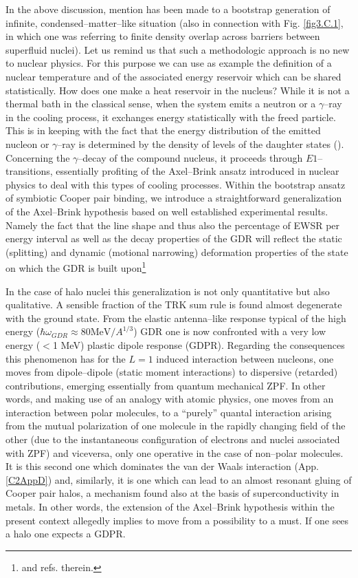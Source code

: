 In the above discussion, mention has been made to a bootstrap generation of infinite, condensed--matter--like situation (also  in connection with Fig. \ref{fig3.C.1}, in which one was referring to finite density overlap across barriers between superfluid nuclei). Let us remind us that such a methodologic approach is no new to nuclear physics. For this purpose we can use as example the definition of a nuclear temperature and of the associated energy reservoir which can be shared statistically. How does one make a heat reservoir in the nucleus? While it is not a thermal bath in the classical sense, when the system emits a neutron or a $\gamma$--ray in the cooling process, it exchanges energy statistically with the freed particle. This is in keeping with the fact that the energy distribution of the emitted nucleon or $\gamma$--ray is determined by the density of levels of the daughter states (\cite{Bortignon:98}). Concerning the $\gamma$--decay of the compound nucleus, it proceeds through $E1$--transitions, essentially profiting of the Axel--Brink ansatz introduced in nuclear physics to deal with this types of cooling processes.
Within the bootstrap ansatz of symbiotic Cooper pair binding, we introduce a straightforward generalization of the Axel--Brink hypothesis based on  well established experimental    results. Namely the fact that the line shape and thus also the percentage of EWSR per energy interval as well as the decay properties of the GDR will reflect the static (splitting) and dynamic (motional narrowing) deformation properties of the state on which the GDR is built upon\footnote{\cite{LeTourneaux:65,Bohr:75,Bortignon:98} and refs. therein.}

In the case of halo nuclei this generalization is not only quantitative but also qualitative. A sensible fraction of the TRK sum rule is found almost degenerate with the ground state. From the elastic antenna--like response typical of the high energy ($\hbar\omega_{GDR}\approx80\text{MeV}/A^{1/3}$) GDR one is now confronted with a very low energy ($<$1 MeV) plastic dipole response (GDPR). Regarding the consequences this phenomenon has for the $L=1$ induced interaction between nucleons, one moves from dipole--dipole (static moment interactions) to dispersive (retarded) contributions, emerging essentially from quantum mechanical ZPF. In other words, and making use of an analogy with atomic physics, one moves from an interaction between polar molecules, to a ``purely'' quantal interaction arising from the mutual polarization of one molecule in the rapidly changing field of the other (due to the instantaneous configuration of electrons and nuclei associated with ZPF) and viceversa, only one operative in the case of non--polar molecules. It is this second one which dominates the van der Waals interaction (App. \ref{C2AppD}) and, similarly, it is one which can lead to an almost resonant gluing of Cooper pair halos, a mechanism found also at the basis of superconductivity in metals. In other words, the extension of the Axel--Brink hypothesis  within the present context allegedly implies to move from a possibility to a must. If one sees a halo one expects a GDPR.


